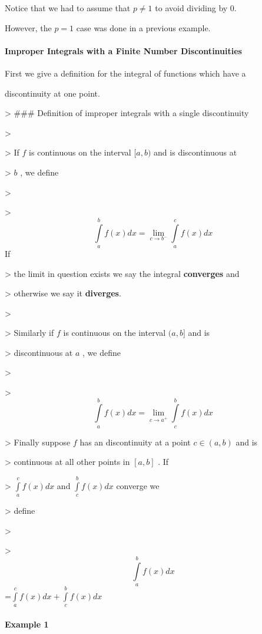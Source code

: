 Notice that we had to assume that $p\ne 1$ to avoid dividing by 0.

However, the $p=1$ case was done in a previous example.



\paragraph{Improper Integrals with a Finite Number Discontinuities}



First we give a definition for the integral of functions which have a

discontinuity at one point.



> ### Definition of improper integrals with a single discontinuity

>

> If $f$ is continuous on the interval $[a,b)$ and is discontinuous at

> $b$ , we define

>

> $$\int\limits _a^b f(x)dx=\lim _{c\to b^-}\int\limits _a^c f(x)dx$$ If

> the limit in question exists we say the integral \textbf{converges} and

> otherwise we say it \textbf{diverges}.

>

> Similarly if $f$ is continuous on the interval $(a,b]$ and is

> discontinuous at $a$ , we define

>

> $$\int\limits _a^b f(x)dx=\lim _{c\to a^+}\int\limits _c^b f(x)dx$$

> Finally suppose $f$ has an discontinuity at a point $c\in(a,b)$ and is

> continuous at all other points in $[a,b]$ . If

> $\int\limits _a^c f(x)dx$ and $\int\limits _c^b f(x)dx$ converge we

> define

>

> $$\int\limits _a^b f(x)dx$$=$\int\limits _a^c f(x)dx+\int\limits _c^b f(x)dx$



\paragraph{Example 1}



